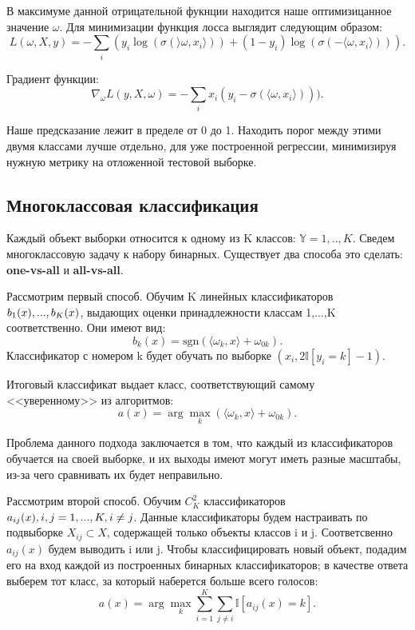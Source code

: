 \documentclass[a4paper, 10pt, openany]{book} %
\begin{document}
	В максимуме данной отрицательной фукнции находится наше оптимизицанное значение $\omega$. Для минимизации функция лосса выглядит следующим образом:
	\begin{equation*}
		L(\omega, X, y) = -\sum_{i}(y_i \log(\sigma(\rangle\omega,x_i\rangle)) + (1 - y_i)\log(\sigma(-\langle\omega,x_i\rangle))).
	\end{equation*}
	
	Градиент функции:
	\begin{equation*}
		\nabla_\omega L(y, X, \omega) = - \sum_{i} x_i (y_i - \sigma(\langle\omega,x_i\rangle))).
	\end{equation*}
	
	Наше предсказание лежит в пределе от 0 до 1. Находить порог между этими двумя классами
	лучше отдельно, для уже построенной регрессии, минимизируя нужную метрику на отложенной тестовой выборке.
	
	\subsection{Многоклассовая классификация}
	
	Каждый объект выборки относится к одному из K классов: $\mathbb{Y} = 1,..,K$. Сведем многоклассовую задачу к набору бинарных. Существует два способа это сделать: \textbf{one-vs-all} и \textbf{all-vs-all}.
	
	Рассмотрим первый способ. Обучим K линейных классификаторов $b_1(x),...,\\b_K(x)$, выдающих оценки принадлежности классам 1,...,K соответственно. Они имеют вид:
	\begin{equation*}
		b_k(x) = \text{sgn}(\langle\omega_k,x\rangle + \omega_{0k}).
	\end{equation*}
	Классификатор с номером k будет обучать по выборке $(x_i,2\mathbb{I}[y_i=k]-1)$. 
	
	Итоговый классификат выдает класс, соответствующий самому <<уверенному>> из алгоритмов:
	\begin{equation*}
		a(x) = \arg\max_k(\langle\omega_k,x\rangle + \omega_{0k}).
	\end{equation*}
	
	Проблема данного подхода заключается в том, что каждый из классификаторов обучается на своей выборке, и их выходы имеют могут иметь разные масштабы, из-за чего сравнивать их будет неправильно.
	
	Рассмотрим второй способ. Обучим $C^2_K$ классификаторов $a_{ij}(x), i,j = 1,...,K, \\
	i \not=j$. Данные классификаторы будем настраивать по подвыборке $X_{ij} \subset X$, содержащей только объекты классов i и j. Соответсвенно $a_{ij}(x)$ будем выводить i или j. Чтобы классифицировать новый объект, подадим его на вход каждой из построенных бинарных классификаторов; в качестве ответа выберем тот класс, за который наберется больше всего голосов:
	\begin{equation*}
		a(x) = \arg\max_k\sum_{i=1}^{K}\sum_{j\not=i}\mathbb{I}[a_{ij}(x)=k].
	\end{equation*}
	
\end{document}

